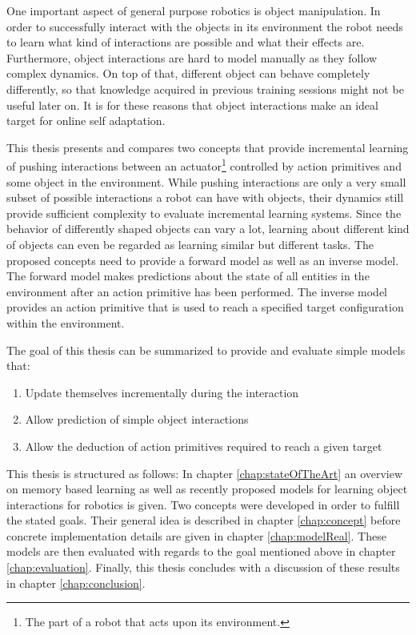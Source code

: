 One important aspect of general purpose robotics is object manipulation. In order to successfully interact with the objects in its environment the robot needs to learn what kind of interactions are possible and what their effects are. 
Furthermore, object interactions are hard to model manually as they follow complex dynamics. On top of that, different object can behave completely differently, so that knowledge acquired in previous training sessions might not be useful later on. It is for these reasons that object interactions make an ideal target for online self adaptation. 

This thesis presents and compares two concepts that provide incremental learning of pushing interactions between an actuator\footnote{The part of a robot that acts upon its environment.} controlled by action primitives and some object in the environment.
While pushing interactions are only a very small subset of possible interactions a robot can have with objects, their dynamics still provide sufficient complexity to evaluate incremental learning systems. Since the behavior of differently shaped objects can vary a lot, learning about different kind of objects can even be regarded as learning similar but different tasks.%
The proposed concepts need to provide a forward model as well as an inverse model. The forward model makes predictions about the state of all entities in the environment after an action primitive has been performed. The inverse model provides an action primitive that is used to reach a specified target configuration within the environment.

The goal of this thesis can be summarized to provide and evaluate simple models that:
\begin{enumerate}
	\item Update themselves incrementally during the interaction
	\item Allow prediction of simple object interactions %
	\item Allow the deduction of action primitives required to reach a given target 
\end{enumerate}

This thesis is structured as follows: In chapter \ref{chap:stateOfTheArt} an overview on memory based learning as well as recently proposed models for learning object interactions for robotics is given. Two concepts were developed in order to fulfill the stated goals. Their general idea is described in chapter \ref{chap:concept} before concrete implementation details are given in chapter \ref{chap:modelReal}. These models are then evaluated with regards to the goal mentioned above in chapter \ref{chap:evaluation}. Finally, this thesis concludes with a discussion of these results in chapter \ref{chap:conclusion}.

